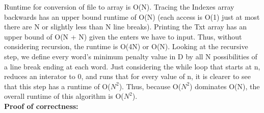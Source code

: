 \documentclass[11pt, solution, letterpaper]{format}
\begin{document}
Runtime for conversion of file to array is O(N). Tracing the Indexes array backwards has an upper bound runtime of O(N) (each access is O(1) just at most there are N or slightly less than N line breaks). Printing the Txt array has an upper bound of O(N + N) given the enters we have to input.  Thus, without considering recursion, the runtime is O(4N) or O(N). Looking at the recursive step, we define every word's minimum penalty value in D by all N possibilities of a line break ending at each word. Just considering the while loop that starts at n, reduces an interator to 0, and runs that for every value of n, it is clearer to see that this step has a runtime of O($N^2$). Thus, because O($N^2$) dominates O(N), the overall runtime of this algorithm is O($N^2$). \\

\textbf{Proof of correctness:}
\end{document}
